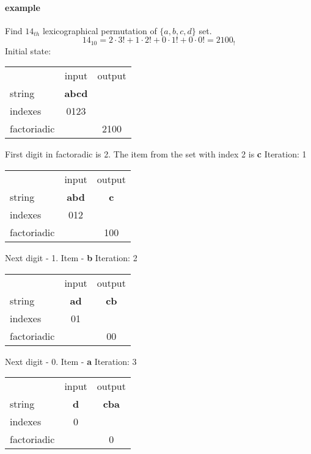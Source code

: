 \documentclass{article}
\begin{document}
\paragraph{example}
Find $14_{th}$ lexicographical permutation of $\{a,b,c,d\}$ set.
\begin{equation*}
    14_{10} = 2 \cdot 3! + 1 \cdot 2! + 0 \cdot 1! + 0 \cdot 0! = 2100_{!}
\end{equation*}
Initial state: \qquad
\begin{tabular}{ l | c | c }
    \hline
    \quad       & input         & output    \\
    string      & \textbf{abcd} & \textbf{} \\
    indexes     &  0123         & \quad     \\
    factoriadic & \quad         & 2100      \\
\end{tabular}
\newline\newline
First digit in factoradic is 2. The item from the set with index 2 is \textbf{c}
\newline
Iteration: 1 \qquad
\begin{tabular}{ l | c | c }
    \hline
    \quad       & input         & output    \\
    string      & \textbf{abd} & \textbf{c} \\
    indexes     &  012         & \quad      \\
    factoriadic & \quad        & 100        \\
\end{tabular}
\newline\newline
Next digit - 1. Item - \textbf{b} \newline
Iteration: 2 \qquad
\begin{tabular}{ l | c | c }
    \hline
    \quad       & input       & output      \\
    string      & \textbf{ad} & \textbf{cb} \\
    indexes     &  01         & \quad       \\
    factoriadic & \quad       & 00          \\
\end{tabular}
\newline\newline

Next digit - 0. Item - \textbf{a} \newline
Iteration: 3 \qquad
\begin{tabular}{ l | c | c }
    \hline
    \quad       & input      & output       \\
    string      & \textbf{d} & \textbf{cba} \\
    indexes     &  0         & \quad        \\
    factoriadic & \quad      & 0            \\
\end{tabular}
\newline\newline
\end{document}

